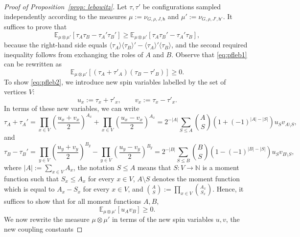 \documentclass[11pt,a4paper]{article}
\numberwithin{equation}{section}
\theoremstyle{plain}
\theoremstyle{definition}
\begin{document}
\begin{proof}[Proof of Proposition~\textup{\ref{prop: lebowitz}}]
Let $\tau, \tau'$ be configurations sampled independently according to the measures $\mu:=\nu_{G,\rho,J,\mathsf{h}}$ and $\mu':=\nu_{G,\rho,J',\mathsf{h}'}$.
It suffices to prove that
\begin{equation}\label{eq:pfleb1}
\mathbb{E}_{\mu\otimes\mu'} [\tau_A\tau_B-\tau_A'\tau_B'] \ge \mathbb{E}_{\mu\otimes\mu'}[\tau_A\tau_B'-\tau_A'\tau_B],
\end{equation}
because the right-hand side equals $\langle \tau_A \rangle \langle\tau_B \rangle' - \langle \tau_A \rangle' \langle \tau_B \rangle$, and the second required inequality follows from exchanging the roles of $A$ and $B$.
Observe that \eqref{eq:pfleb1} can be rewritten as
\begin{equation}\label{eq:pfleb2}
\mathbb{E}_{\mu\otimes\mu'} [(\tau_A + \tau'_A)(\tau_B - \tau'_B)] \ge 0.
\end{equation}
To show \eqref{eq:pfleb2}, we introduce new spin variables labelled by the set of vertices $V$:
\begin{equation}
u_x := \tau_x + \tau'_x, \qquad v_x := \tau_x - \tau'_x.
\end{equation}
In terms of these new variables, we can write 
\begin{equation}
\tau_A+\tau_A' = \prod_{x\in V} \left(\frac{u_x+v_x}{2}\right)^{A_x} + \prod_{x\in V} \left(\frac{u_x-v_x}{2}\right)^{A_x}=2^{-|A|}\sum_{S\le A}\binom{A}{S}(1+(-1)^{|A|-|S|})u_S v_{A\setminus S},
\end{equation}
and
\begin{equation}
\tau_B-\tau_B' = \prod_{y\in V} \left(\frac{u_y+v_y}{2}\right)^{B_y} - \prod_{y\in V} \left(\frac{u_y-v_y}{2}\right)^{B_y}=
2^{-|B|}\sum_{S\le B}\binom{B}{S}(1-(-1)^{|B|-|S|})u_S v_{B\setminus S},
\end{equation}
where $|A|:=\sum_{x\in V} A_x$, the notation $S\le A$ means that $S:V \to\mathbb{N}$ is a moment function such that $S_x\le A_x$ for every $x\in V$, $A\setminus S$ denotes the moment function which is equal to $A_x- S_x$ for every $x\in V$, and $\binom{A}{S}:=\prod_{x\in V}\binom{A_x}{S_x}$.
Hence, it suffices to show that for all moment functions $A,B$,  
\begin{equation}\label{eq:what-we-need-to-prove}
\mathbb{E}_{\mu\otimes\mu'}[u_Av_B]\geq 0.
\end{equation}
We now rewrite the measure $\mu\otimes \mu'$ in terms of the new spin variables $u,v$, the new coupling constants 

\end{proof}
\end{document}
